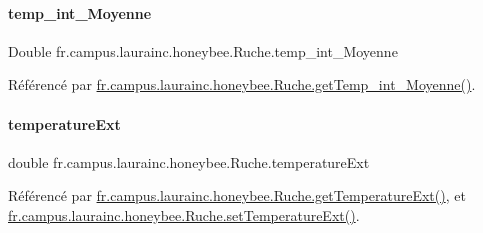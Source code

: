 \mbox{\label{classfr_1_1campus_1_1laurainc_1_1honeybee_1_1_ruche_a99bf4c97fe3710861e0a730cc0010bfb}} 
\paragraph{\texorpdfstring{temp\+\_\+int\+\_\+\+Moyenne}{temp\_int\_Moyenne}}
{\footnotesize\ttfamily Double fr.\+campus.\+laurainc.\+honeybee.\+Ruche.\+temp\+\_\+int\+\_\+\+Moyenne\hspace{0.3cm}{\ttfamily [private]}}



Référencé par \hyperlink{classfr_1_1campus_1_1laurainc_1_1honeybee_1_1_ruche_a1524a14620300cf3d3d16d956e7953e5}{fr.\+campus.\+laurainc.\+honeybee.\+Ruche.\+get\+Temp\+\_\+int\+\_\+\+Moyenne()}.

\mbox{\label{classfr_1_1campus_1_1laurainc_1_1honeybee_1_1_ruche_aabdc13a8650aed77ee5497236e79174b}} 
\paragraph{\texorpdfstring{temperature\+Ext}{temperatureExt}}
{\footnotesize\ttfamily double fr.\+campus.\+laurainc.\+honeybee.\+Ruche.\+temperature\+Ext\hspace{0.3cm}{\ttfamily [private]}}



Référencé par \hyperlink{classfr_1_1campus_1_1laurainc_1_1honeybee_1_1_ruche_ac42e5846fb470d9ac9112c20c8679980}{fr.\+campus.\+laurainc.\+honeybee.\+Ruche.\+get\+Temperature\+Ext()}, et \hyperlink{classfr_1_1campus_1_1laurainc_1_1honeybee_1_1_ruche_a5f3aa639b62e7bebcec6532be378964d}{fr.\+campus.\+laurainc.\+honeybee.\+Ruche.\+set\+Temperature\+Ext()}.

